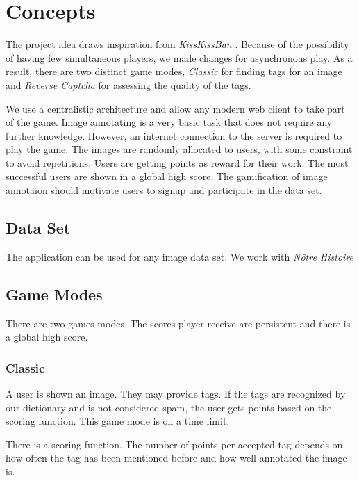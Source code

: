 \section{Concepts}
\label{g14:sec:concepts} %

The project idea draws inspiration from \textit{KissKissBan} \cite{10.1145/1600150.1600153}.
Because of the possibility of having few simultaneous players, we made changes for asynchronous play. As a result, there are two distinct game modes, \emph{Classic} for finding tags for an image and \emph{Reverse Captcha} for assessing the quality of the tags.

We use a centralistic architecture and allow any modern web client to take part of the game. Image annotating is a very basic task that does not require any further knowledge. However, an internet connection to the server is required to play the game. The images are randomly allocated to users, with some constraint to avoid repetitions.
Users are getting points as reward for their work. The most successful users are shown in a global high score. The gamification of image annotaion should motivate users to signup and participate in the data set.


\subsection{Data Set}
\label{g14:sec:concepts:dataset}
The application can be used for any image data set. We work with \textit{Nôtre Histoire}

\subsection{Game Modes}
\label{g14:sec:concepts:gamemodes}

There are two games modes. The scores player receive are persistent and there is a global high score. 

\subsubsection{Classic}
\label{g14:sec:concepts:gamemodes:classic}
A user is shown an image. They may provide tags. If the tags are recognized by our dictionary and is not considered spam, the user gets points based on the scoring function.
This game mode is on a time limit.

There is a scoring function. The number of points per accepted tag depends on how often the tag has been mentioned before and how well annotated the image is.

